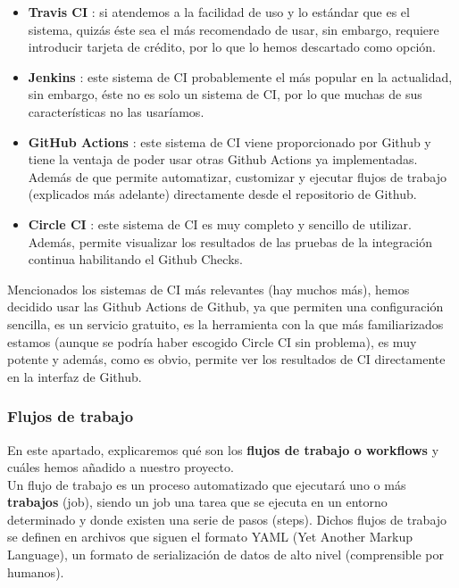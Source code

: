     \begin{itemize}
        \item \textbf{Travis CI} \cite{travis-ci}: si atendemos a la facilidad de uso y lo
        estándar que es el sistema, quizás éste sea el más recomendado de usar, sin embargo,
        requiere introducir tarjeta de crédito, por lo que lo hemos descartado como opción.
        \item \textbf{Jenkins} \cite{jenkins}: este sistema de CI probablemente el más popular
        en la actualidad, sin embargo, éste no es solo un sistema de CI, por lo que muchas de
        sus características no las usaríamos.
        \item \textbf{GitHub Actions} \cite{github-actions}: este sistema de CI viene
        proporcionado por Github y tiene la ventaja de poder usar otras Github Actions ya
        implementadas. Además de que permite automatizar, customizar y ejecutar flujos de
        trabajo (explicados más adelante) directamente desde el repositorio de Github.
        \item \textbf{Circle CI} \cite{circle-ci}: este sistema de CI es muy completo y
        sencillo de utilizar. Además, permite visualizar los resultados de las pruebas de la
        integración continua habilitando el Github Checks.
    \end{itemize}

    Mencionados los sistemas de CI más relevantes (hay muchos más), hemos decidido usar las
    Github Actions de Github, ya que permiten una configuración sencilla, es un servicio
    gratuito, es la herramienta con la que más familiarizados estamos (aunque se podría haber
    escogido Circle CI sin problema), es muy potente y además, como es obvio, permite ver los
    resultados de CI directamente en la interfaz de Github.

\newpage
\subsubsection{Flujos de trabajo}
En este apartado, explicaremos qué son los \textbf{flujos de trabajo o workflows} y cuáles
hemos añadido a nuestro proyecto.\\

Un flujo de trabajo es un proceso automatizado que ejecutará uno o más \textbf{trabajos}
(job), siendo un job una tarea que se ejecuta en un entorno determinado y donde existen una
serie de pasos (steps). Dichos flujos de trabajo se definen en archivos que siguen el formato
YAML (Yet Another Markup Language), un formato de serialización de datos de alto nivel
(comprensible por humanos).\\

